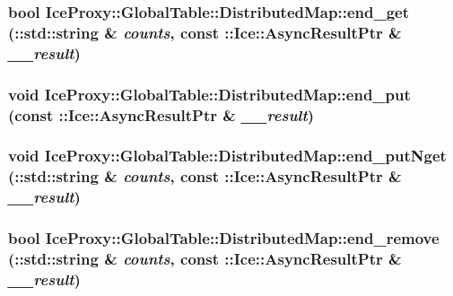 \label{class_ice_proxy_1_1_global_table_1_1_distributed_map_a874afc4d8f61d5e42bfdecfb69555e9b}
\hypertarget{class_ice_proxy_1_1_global_table_1_1_distributed_map_a13fa97edac4be45474d7079ff2516efe}{
\subsubsection[{end\_\-get}]{\setlength{\rightskip}{0pt plus 5cm}bool IceProxy::GlobalTable::DistributedMap::end\_\-get (::std::string \& {\em counts}, \/  const ::Ice::AsyncResultPtr \& {\em \_\-\_\-result})}}
\label{class_ice_proxy_1_1_global_table_1_1_distributed_map_a13fa97edac4be45474d7079ff2516efe}
\hypertarget{class_ice_proxy_1_1_global_table_1_1_distributed_map_af82dc5733e3aa14b2b29368475609a74}{
\subsubsection[{end\_\-put}]{\setlength{\rightskip}{0pt plus 5cm}void IceProxy::GlobalTable::DistributedMap::end\_\-put (const ::Ice::AsyncResultPtr \& {\em \_\-\_\-result})}}
\label{class_ice_proxy_1_1_global_table_1_1_distributed_map_af82dc5733e3aa14b2b29368475609a74}
\hypertarget{class_ice_proxy_1_1_global_table_1_1_distributed_map_a185600a48b9d0bdf47176b27f3b4c87a}{
\subsubsection[{end\_\-putNget}]{\setlength{\rightskip}{0pt plus 5cm}void IceProxy::GlobalTable::DistributedMap::end\_\-putNget (::std::string \& {\em counts}, \/  const ::Ice::AsyncResultPtr \& {\em \_\-\_\-result})}}
\label{class_ice_proxy_1_1_global_table_1_1_distributed_map_a185600a48b9d0bdf47176b27f3b4c87a}
\hypertarget{class_ice_proxy_1_1_global_table_1_1_distributed_map_a8875ce0c21f88fd62c59d40e5991f248}{
\subsubsection[{end\_\-remove}]{\setlength{\rightskip}{0pt plus 5cm}bool IceProxy::GlobalTable::DistributedMap::end\_\-remove (::std::string \& {\em counts}, \/  const ::Ice::AsyncResultPtr \& {\em \_\-\_\-result})}}
